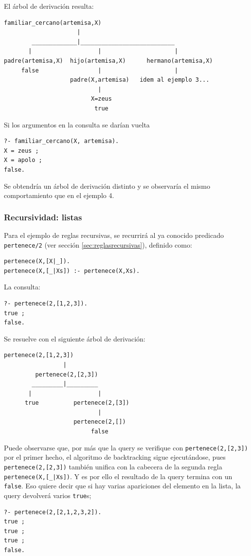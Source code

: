 \documentclass[12pt,titlepage]{article}
\begin{document}
El árbol de derivación resulta:
\begin{Verbatim}[samepage=true,fontsize=\small]
            familiar_cercano(artemisa,X)
                     |
        _____________|___________________________
       |                   |                     |
padre(artemisa,X)  hijo(artemisa,X)      hermano(artemisa,X)
     false                 |                     |
                   padre(X,artemisa)   idem al ejemplo 3...
                           |
                         X=zeus
                          true
\end{Verbatim}

Si los argumentos en la consulta se darían vuelta
\begin{lstlisting}
?- familiar_cercano(X, artemisa).
X = zeus ;
X = apolo ;
false.
\end{lstlisting}
Se obtendría un árbol de derivación distinto y se observaría el mismo comportamiento que en el ejemplo 4.

\subsubsection{Recursividad: listas}

Para el ejemplo de reglas recursivas, se recurrirá al ya conocido predicado \lstinline|pertenece/2| (ver sección \ref{sec:reglasrecursivas}), definido como:
\begin{lstlisting}
pertenece(X,[X|_]).
pertenece(X,[_|Xs]) :- pertenece(X,Xs).
\end{lstlisting}

La consulta:
\begin{lstlisting}
?- pertenece(2,[1,2,3]).
true ;
false.
\end{lstlisting}

Se resuelve con el siguiente árbol de derivación:
\begin{Verbatim}[samepage=true,fontsize=\small]
        pertenece(2,[1,2,3])
                 |
         pertenece(2,[2,3])
        _________|_________
       |                   |
      true          pertenece(2,[3])
                           |       
                    pertenece(2,[])
                         false
\end{Verbatim}

Puede observarse que, por más que la query se verifique con \lstinline|pertenece(2,[2,3])| por el primer hecho, el algoritmo de backtracking sigue ejecutándose, pues \lstinline|pertenece(2,[2,3])| también unifica con la cabecera de la segunda regla \lstinline$pertenece(X,[_|Xs])$. Y es por ello el resultado de la query termina con un \lstinline|false|. Eso quiere decir que si hay varias apariciones del elemento en la lista, la query devolverá varios \lstinline|true|s;
\begin{lstlisting}
?- pertenece(2,[2,1,2,3,2]).
true ;
true ;
true ;
false.
\end{lstlisting}
\end{document}
